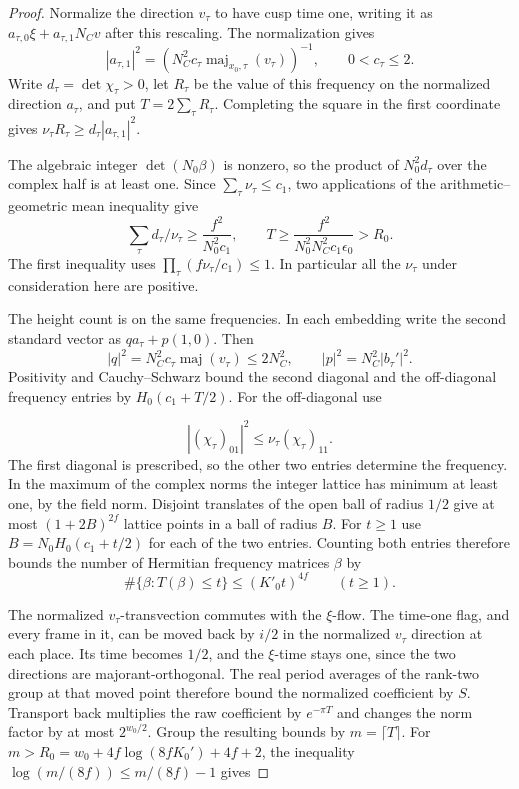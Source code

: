 \begin{proof}
Normalize the direction \(v_\tau\) to have cusp time one, writing
it as \(a_{\tau,0}\xi+a_{\tau,1}N_Cv\) after this rescaling.
The normalization gives
\[
 |a_{\tau,1}|^2
   = (N_C^2 c_\tau\operatorname{maj}_{x_0,\tau}(v_\tau))^{-1},
 \qquad 0<c_\tau\le2 .
\]
Write \(d_\tau=\det\chi_\tau>0\), let \(R_\tau\) be the value of
this frequency on the normalized direction \(a_\tau\), and put
\(T=2\sum_\tau R_\tau\). Completing the square in the first
coordinate gives \(\nu_\tau R_\tau\ge d_\tau|a_{\tau,1}|^2\).

The algebraic integer \(\det(N_0\beta)\) is nonzero, so the
product of \(N_0^2d_\tau\) over the complex half is at least one.
Since \(\sum_\tau\nu_\tau\le c_1\), two applications of the
arithmetic--geometric mean inequality give
\[
 \sum_\tau d_\tau/\nu_\tau\ge \frac{f^2}{N_0^2c_1},
 \qquad T\ge\frac{f^2}{N_0^2N_C^2c_1\epsilon_0}> R_0 .
\]
The first inequality uses
\(\prod_\tau(f\nu_\tau/c_1)\le1\). In particular all the
\(\nu_\tau\) under consideration here are positive.

The height count is on the same frequencies. In each embedding
write the second standard vector as \(q a_\tau+p(1,0)\).
Then \[
 |q|^2=N_C^2 c_\tau\operatorname{maj}(v_\tau)\le2N_C^2,\qquad |p|^2=N_C^2|b_\tau'|^2.
\]
Positivity and Cauchy--Schwarz bound the second diagonal and
the off-diagonal frequency entries by \(H_0(c_1+T/2)\).
For the off-diagonal use

\[
  |(\chi_\tau)_{01}|^2\le\nu_\tau(\chi_\tau)_{11}.
\]
The first diagonal is prescribed, so the other two entries
determine the frequency. In the maximum of the complex norms
the integer lattice has minimum at least one, by the field norm.
Disjoint translates of the open ball of radius \(1/2\) give at
most \((1+2B)^{2f}\) lattice points in a ball of radius \(B\).
For \(t\ge1\) use \(B=N_0 H_0(c_1+t/2)\) for each of the two
entries. Counting both entries therefore bounds the number of Hermitian frequency matrices \(\beta\) by
\[
  \#\{\beta:T(\beta)\le t\}\le(K'_0t)^{4f}\qquad(t\ge1).
\]

The normalized \(v_\tau\)-transvection commutes with the
\(\xi\)-flow. The time-one flag, and every frame in it, can be
moved back by \(i/2\) in the normalized \(v_\tau\) direction
at each place. Its time becomes \(1/2\), and the \(\xi\)-time
stays one, since the two directions are majorant-orthogonal.
The real period averages of the rank-two group at that moved
point therefore bound the normalized coefficient by \(S\).
Transport back multiplies the raw coefficient by \(e^{-\pi T}\)
and changes the norm factor by at most \(2^{w_0/2}\).
Group the resulting bounds by \(m=\lceil T\rceil\). For
\(m>R_0=w_0+4f\log(8fK_0')+4f+2\), the inequality
\(\log(m/(8f))\le m/(8f)-1\) gives


\end{proof}
